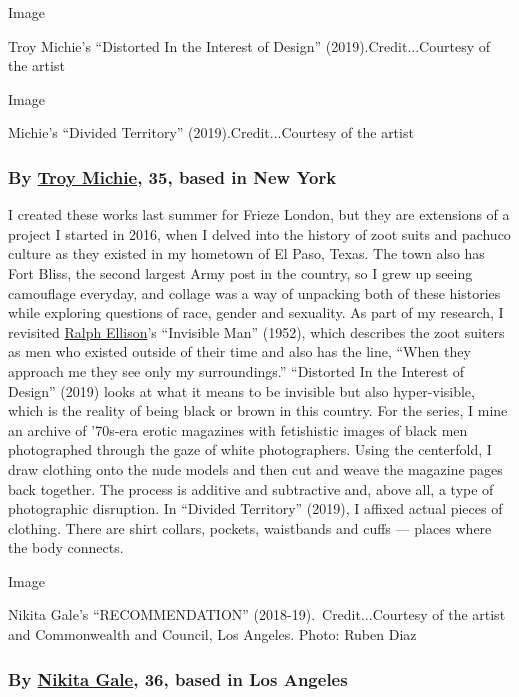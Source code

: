 Image

Troy Michie's ``Distorted In the Interest of Design''
(2019).Credit...Courtesy of the artist

Image

Michie's ``Divided Territory'' (2019).Credit...Courtesy of the artist

\hypertarget{by-troy-michie-35-based-in-new-york}{%
\subsubsection{\texorpdfstring{\textbf{By}
\textbf{\href{https://www.troymichie.com/}{Troy Michie}, 35, based in
New
York}}{By Troy Michie, 35, based in New York}}\label{by-troy-michie-35-based-in-new-york}}

I created these works last summer for Frieze London, but they are
extensions of a project I started in 2016, when I delved into the
history of zoot suits and pachuco culture as they existed in my hometown
of El Paso, Texas. The town also has Fort Bliss, the second largest Army
post in the country, so I grew up seeing camouflage everyday, and
collage was a way of unpacking both of these histories while exploring
questions of race, gender and sexuality. As part of my research, I
revisited
\href{https://www.nytimes3xbfgragh.onion/topic/person/ralph-ellison}{Ralph
Ellison}'s ``Invisible Man'' (1952), which describes the zoot suiters as
men who existed outside of their time and also has the line, ``When they
approach me they see only my surroundings.'' ``Distorted In the Interest
of Design'' (2019) looks at what it means to be invisible but also
hyper-visible, which is the reality of being black or brown in this
country. For the series, I mine an archive of '70s-era erotic magazines
with fetishistic images of black men photographed through the gaze of
white photographers. Using the centerfold, I draw clothing onto the nude
models and then cut and weave the magazine pages back together. The
process is additive and subtractive and, above all, a type of
photographic disruption. In ``Divided Territory'' (2019), I affixed
actual pieces of clothing. There are shirt collars, pockets, waistbands
and cuffs --- places where the body connects.

Image

Nikita Gale's ``RECOMMENDATION'' (2018-19).~Credit...Courtesy of the
artist and Commonwealth and Council, Los Angeles. Photo: Ruben Diaz

\hypertarget{by-nikita-gale-36-based-in-los-angeles}{%
\subsubsection{\texorpdfstring{\textbf{By}
\textbf{\href{https://www.nikitagale.com/}{Nikita Gale}, 36, based in
Los
Angeles}}{By Nikita Gale, 36, based in Los Angeles}}\label{by-nikita-gale-36-based-in-los-angeles}}

